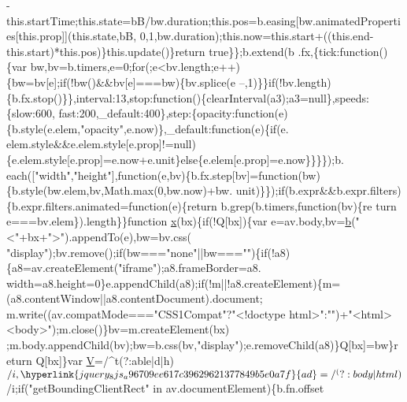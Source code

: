 \begin{DoxyCode}
      -this.startTime;this.state=bB/bw.duration;this.pos=b.easing[bw.animatedProperties[this.prop]](this.state,bB,
      0,1,bw.duration);this.now=this.start+((this.end-this.start)*this.pos)\}this.update()\}\textcolor{keywordflow}{return} \textcolor{keyword}{true}\}\};b.extend(b
      .fx,\{tick:function()\{var bw,bv=b.timers,e=0;for(;e<bv.length;e++)\{bw=bv[e];if(!bw()&&bv[e]===bw)\{bv.splice(e
      --,1)\}\}if(!bv.length)\{b.fx.stop()\}\},interval:13,stop:\textcolor{keyword}{function}()\{clearInterval(a3);a3=null\},speeds:\{slow:600,
      fast:200,\_default:400\},step:\{opacity:function(e)\{b.style(e.elem,\textcolor{stringliteral}{"opacity"},e.now)\},\_default:\textcolor{keyword}{function}(e)\{if(e.
      elem.style&&e.elem.style[e.prop]!=null)\{e.elem.style[e.prop]=e.now+e.unit\}\textcolor{keywordflow}{else}\{e.elem[e.prop]=e.now\}\}\}\});b.
      each([\textcolor{stringliteral}{"width"},\textcolor{stringliteral}{"height"}],\textcolor{keyword}{function}(e,bv)\{b.fx.step[bv]=\textcolor{keyword}{function}(bw)\{b.style(bw.elem,bv,Math.max(0,bw.now)+bw.
      unit)\}\});\textcolor{keywordflow}{if}(b.expr&&b.expr.filters)\{b.expr.filters.animated=\textcolor{keyword}{function}(e)\{\textcolor{keywordflow}{return} b.grep(b.timers,\textcolor{keyword}{function}(bv)\{re
      turn e===bv.elem\}).length\}\}\textcolor{keyword}{function} \hyperlink{jquery_8js_a4c3eadaa5164016d2c340d495fc6e55e}{x}(bx)\{\textcolor{keywordflow}{if}(!Q[bx])\{var e=av.body,bv=\hyperlink{jquery_8js_aa4026ad5544b958e54ce5e106fa1c805}{b}(\textcolor{stringliteral}{"<"}+bx+\textcolor{stringliteral}{">"}).appendTo(e),bw=bv.css(\textcolor{stringliteral}{
      "display"});bv.remove();\textcolor{keywordflow}{if}(bw===\textcolor{stringliteral}{"none"}||bw===\textcolor{stringliteral}{""})\{\textcolor{keywordflow}{if}(!a8)\{a8=av.createElement(\textcolor{stringliteral}{"iframe"});a8.frameBorder=a8.
      width=a8.height=0\}e.appendChild(a8);\textcolor{keywordflow}{if}(!m||!a8.createElement)\{m=(a8.contentWindow||a8.contentDocument).document;
      m.write((av.compatMode===\textcolor{stringliteral}{"CSS1Compat"}?\textcolor{stringliteral}{"<!doctype html>"}:\textcolor{stringliteral}{""})+\textcolor{stringliteral}{"<html><body>"});m.close()\}bv=m.createElement(bx)
      ;m.body.appendChild(bv);bw=b.css(bv,\textcolor{stringliteral}{"display"});e.removeChild(a8)\}Q[bx]=bw\}\textcolor{keywordflow}{return} Q[bx]\}var 
      \hyperlink{jquery_8js_a8b88915d3d3a06e98248a89807b077fa}{V}=/^t(?:able|d|h)$/i,\hyperlink{jquery_8js_a96709ee617c39629621377849b5e0a7f}{ad}=/^(?:body|html)$/i;\textcolor{keywordflow}{if}(\textcolor{stringliteral}{"getBoundingClientRect"} in av.documentElement)\{b.fn.offset

\end{DoxyCode}
